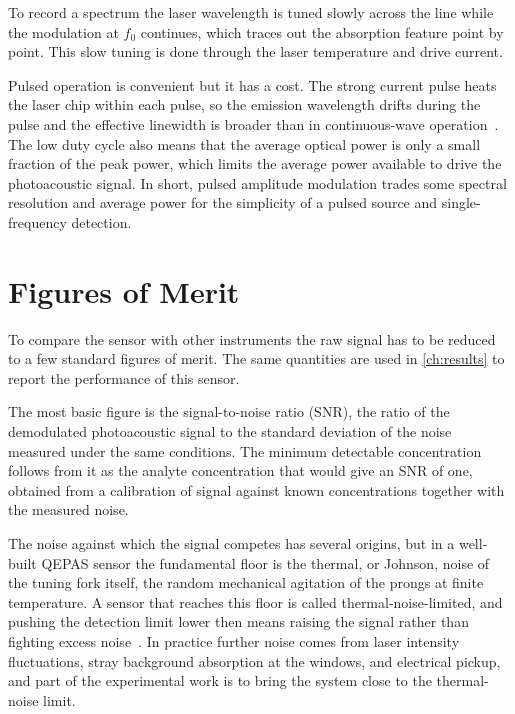 To record a spectrum the laser wavelength is tuned slowly across the line while the modulation at $f_0$ continues, which traces out the absorption feature point by point. This slow tuning is done through the laser temperature and drive current.

Pulsed operation is convenient but it has a cost. The strong current pulse heats the laser chip within each pulse, so the emission wavelength drifts during the pulse and the effective linewidth is broader than in continuous-wave operation~. The low duty cycle also means that the average optical power is only a small fraction of the peak power, which limits the average power available to drive the photoacoustic signal. In short, pulsed amplitude modulation trades some spectral resolution and average power for the simplicity of a pulsed source and single-frequency detection.

\section{Figures of Merit}
\label{sec:fom}

To compare the sensor with other instruments the raw signal has to be reduced to a few standard figures of merit. The same quantities are used in \cref{ch:results} to report the performance of this sensor.

The most basic figure is the signal-to-noise ratio (SNR), the ratio of the demodulated photoacoustic signal to the standard deviation of the noise measured under the same conditions. The minimum detectable concentration follows from it as the analyte concentration that would give an SNR of one, obtained from a calibration of signal against known concentrations together with the measured noise.

The noise against which the signal competes has several origins, but in a well-built QEPAS sensor the fundamental floor is the thermal, or Johnson, noise of the tuning fork itself, the random mechanical agitation of the prongs at finite temperature. A sensor that reaches this floor is called thermal-noise-limited, and pushing the detection limit lower then means raising the signal rather than fighting excess noise~. In practice further noise comes from laser intensity fluctuations, stray background absorption at the windows, and electrical pickup, and part of the experimental work is to bring the system close to the thermal-noise limit.

